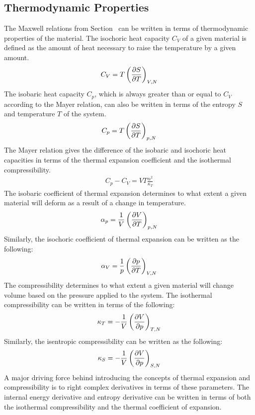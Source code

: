 \subsection{Thermodynamic Properties}\label{thermoprop}
The Maxwell relations from Section~ can be written in terms of thermodynamic properties of the material.  The isochoric heat capacity $C_V$ of a given material is defined as the amount of heat necessary to raise the temperature by a given amount.
\begin{align}
    C_V = T\left(\pdv{S}{T}\right )_{V,N}
\end{align}
The isobaric heat capacity $C_p$, which is always greater than or equal to $C_V$ according to the Mayer relation, can also be written in terms of the entropy $S$ and temperature $T$ of the system.
\begin{align}
    C_p = T\left(\pdv{S}{T}\right )_{p,N}
\end{align}
The Mayer relation gives the difference of the isobaric and isochoric heat capacities in terms of the thermal expansion coefficient and the isothermal compressibility.
\begin{align}
    C_p - C_V = VT\frac{\alpha^2}{\kappa_T}
\end{align}
The isobaric coefficient of thermal expansion determines to what extent a given material will deform as a result of a change in temperature.
\begin{align}
    \alpha_p = \frac{1}{V}\left( \pdv{V}{T} \right )_{p,N}
\end{align}
Similarly, the isochoric coefficient of thermal expansion can be written as the following:
\begin{align}
    \alpha_V = \frac{1}{p}\left( \pdv{p}{T} \right )_{V,N}
\end{align}
The compressibility determines to what extent a given material will change volume based on the pressure applied to the system.  The isothermal compressibility can be written in terms of the following:
\begin{align}
    \kappa_T = -\frac{1}{V}\left( \pdv{V}{p} \right )_{T,N}
\end{align}
Similarly, the isentropic compressibility can be written as the following:
\begin{align}
    \kappa_S = -\frac{1}{V}\left( \pdv{V}{p} \right )_{S,N}
\end{align}
A major driving force behind introducing the concepts of thermal expansion and compressibility is to right complex derivatives in terms of these parameters. The internal energy derivative and entropy derivative can be written in terms of both the isothermal compressibility and the thermal coefficient of expansion.
